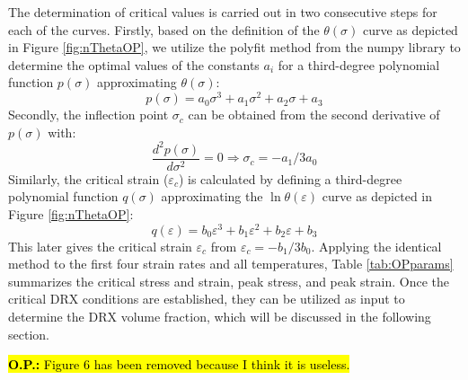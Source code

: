 \documentclass[metals,article,submit,pdftex,moreauthors]{Definitions/mdpi}
\DeclareRobustCommand{\OP}[1]{\begingroup\sethlcolor{VWyellow}\textcolor{red}{\hl{\textbf{O.P.:} #1}}\endgroup}
\begin{document}
The determination of critical values is carried out in two consecutive steps for each of the curves.
Firstly, based on the definition of the $\theta(\sigma)$ curve as depicted in Figure \ref{fig:nThetaOP}, we utilize the polyfit method from the numpy library to determine the optimal values of the constants $a_i$ for a third-degree polynomial function $p(\sigma)$ approximating $\theta(\sigma)$:
\begin{equation}
p(\sigma) = a_0\sigma^3 + a_1\sigma^2 + a_2\sigma + a_3
\end{equation}
Secondly, the inflection point $\sigma_c$ can be obtained from the second derivative of $p(\sigma)$ with:
\begin{equation}
\frac{d^2 p(\sigma)}{d \sigma^2} = 0 \Longrightarrow \sigma_c = -a_1/3a_0
\end{equation}
Similarly, the critical strain ($\varepsilon_c$) is calculated by defining a third-degree polynomial function $q(\sigma)$ approximating the $\ln \theta(\varepsilon)$ curve as depicted in Figure \ref{fig:nThetaOP}:
\begin{equation}
q(\varepsilon) = b_0\varepsilon^3 + b_1\varepsilon^2 + b_2\varepsilon + b_3
\end{equation}
This later gives the critical strain $\varepsilon_c$ from $\varepsilon_c = -b_1/3b_0$.
Applying the identical method to the first four strain rates and all temperatures, Table \ref{tab:OPparams} summarizes the critical stress and strain, peak stress, and peak strain.
Once the critical DRX conditions are established, they can be utilized as input to determine the DRX volume fraction, which will be discussed in the following section.

\OP{Figure 6 has been removed because I think it is useless.}
\end{document}
